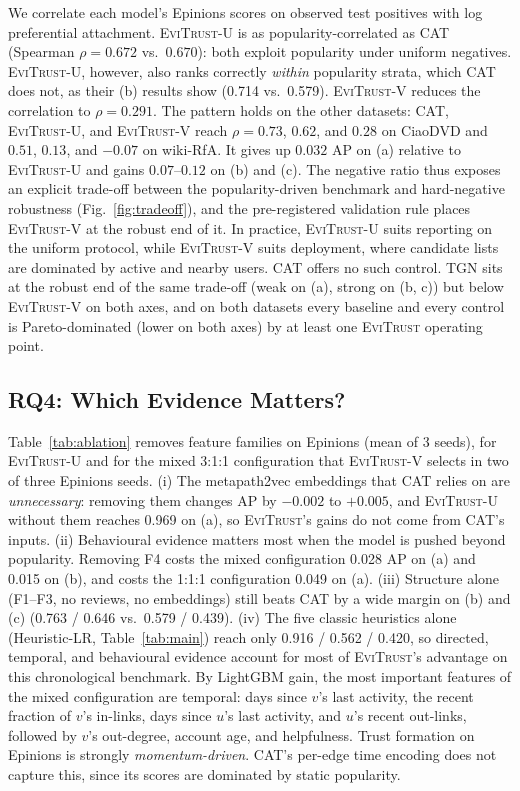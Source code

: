 \documentclass[conference]{IEEEtran}
\newcommand{\evi}{\textsc{EviTrust}}
\newcommand{\eviU}{\textsc{EviTrust}-U}
\newcommand{\eviV}{\textsc{EviTrust}-V}
\begin{document}
We correlate each model's Epinions scores on observed test positives with log preferential attachment. \eviU{} is as popularity-correlated as CAT (Spearman $\rho=0.672$ vs.\ $0.670$): both exploit popularity under uniform negatives. \eviU{}, however, also ranks correctly \emph{within} popularity strata, which CAT does not, as their (b) results show (0.714 vs.\ 0.579). \eviV{} reduces the correlation to $\rho=0.291$. The pattern holds on the other datasets: CAT, \eviU{}, and \eviV{} reach $\rho=0.73$, $0.62$, and $0.28$ on CiaoDVD and $0.51$, $0.13$, and $-0.07$ on wiki-RfA. It gives up $0.032$ AP on (a) relative to \eviU{} and gains $0.07$--$0.12$ on (b) and (c). The negative ratio thus exposes an explicit trade-off between the popularity-driven benchmark and hard-negative robustness (Fig.~\ref{fig:tradeoff}), and the pre-registered validation rule places \eviV{} at the robust end of it. In practice, \eviU{} suits reporting on the uniform protocol, while \eviV{} suits deployment, where candidate lists are dominated by active and nearby users. CAT offers no such control. TGN sits at the robust end of the same trade-off (weak on (a), strong on (b, c)) but below \eviV{} on both axes, and on both datasets every baseline and every control is Pareto-dominated (lower on both axes) by at least one \evi{} operating point.

\subsection{RQ4: Which Evidence Matters?}
\label{sec:ablation}

Table~\ref{tab:ablation} removes feature families on Epinions (mean of 3 seeds), for \eviU{} and for the mixed 3:1:1 configuration that \eviV{} selects in two of three Epinions seeds.
(i) The metapath2vec embeddings that CAT relies on are \emph{unnecessary}: removing them changes AP by $-0.002$ to $+0.005$, and \eviU{} without them reaches 0.969 on (a), so \evi{}'s gains do not come from CAT's inputs.
(ii) Behavioural evidence matters most when the model is pushed beyond popularity. Removing F4 costs the mixed configuration 0.028 AP on (a) and 0.015 on (b), and costs the 1:1:1 configuration 0.049 on (a).
(iii) Structure alone (F1--F3, no reviews, no embeddings) still beats CAT by a wide margin on (b) and (c) (0.763 / 0.646 vs.\ 0.579 / 0.439).
(iv) The five classic heuristics alone (Heuristic-LR, Table~\ref{tab:main}) reach only 0.916 / 0.562 / 0.420, so directed, temporal, and behavioural evidence account for most of \evi{}'s advantage on this chronological benchmark.
By LightGBM gain, the most important features of the mixed configuration are temporal: days since $v$'s last activity, the recent fraction of $v$'s in-links, days since $u$'s last activity, and $u$'s recent out-links, followed by $v$'s out-degree, account age, and helpfulness. Trust formation on Epinions is strongly \emph{momentum-driven}. CAT's per-edge time encoding does not capture this, since its scores are dominated by static popularity.
\end{document}

